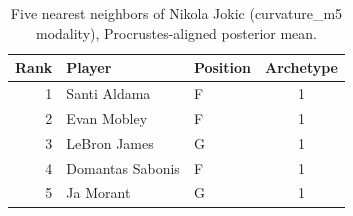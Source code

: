 \begin{table}[htbp]
  \centering\small
  \begin{tabular}{rllc}
    \toprule
    Rank & Player & Position & Archetype \\
    \midrule
    1 & Santi Aldama & F & 1 \\
    2 & Evan Mobley & F & 1 \\
    3 & LeBron James & G & 1 \\
    4 & Domantas Sabonis & F & 1 \\
    5 & Ja Morant & G & 1 \\
    \bottomrule
  \end{tabular}
  \caption{Five nearest neighbors of Nikola Jokic (curvature_m5 modality), Procrustes-aligned posterior mean.}
  \label{tab:Nikola_Jokic_neighbors_curvature_m5}
\end{table}

